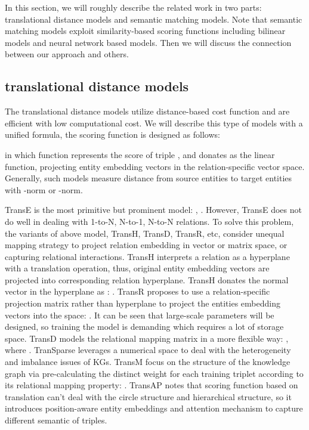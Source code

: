 \documentclass[letterpaper]{article} \usepackage{aaai20}  \usepackage{times}  \usepackage{helvet} \usepackage{courier}  \usepackage[hyphens]{url}  \usepackage{graphicx} \usepackage{lineno,hyperref,amsmath,amssymb}
\begin{document}
In this section, we will roughly describe the related work in two parts: translational distance models and semantic matching models. Note that semantic matching models exploit similarity-based scoring functions including bilinear models and neural network based models. Then we will discuss the connection between our approach and others.

\subsection{translational distance models}

The translational distance models utilize distance-based cost function and are efficient with low computational cost. We will describe this type of models with a unified formula, the scoring function is designed as follows:

in which function  represents the score of triple , and  donates as the linear function, projecting entity embedding vectors in the relation-specific vector space. Generally, such models measure distance from source entities to target entities with -norm or -norm.

TransE\cite{abboud2020boxe} is the most primitive but prominent model: , . However, TransE does not do well in dealing with 1-to-N, N-to-1, N-to-N relations. To solve this problem, the variants of above model, TransH, TransD, TransR, etc, consider unequal mapping strategy to project relation embedding in vector or matrix space, or capturing relational interactions\cite{ji2020survey}. TransH\cite{wang2014knowledge} interprets a relation as a hyperplane with a translation operation, thus, original entity embedding vectors are projected into corresponding relation hyperplane. TransH donates the normal vector in the hyperplane as :  . TransR\cite{lin2015learning} proposes to use a relation-specific projection matrix  rather than hyperplane to project the entities embedding vectors into the space: . It can be seen that large-scale parameters will be designed, so training the model is demanding which requires a lot of storage space. TransD\cite{ji2015knowledge} models the relational mapping matrix  in a more flexible way: , where . TranSparse\cite{ji2016knowledge} leverages a numerical space to deal with the heterogeneity and imbalance issues of KGs. TransM\cite{fan2014transition} focus on the structure of the knowledge graph via pre-calculating the distinct weight for each training triplet according to its relational mapping property: . TransAP\cite{zhang2020improve} notes that scoring function based on translation can’t deal with the circle structure and hierarchical structure, so it introduces position-aware entity embeddings and attention mechanism to capture different semantic of triples.
\end{document}
